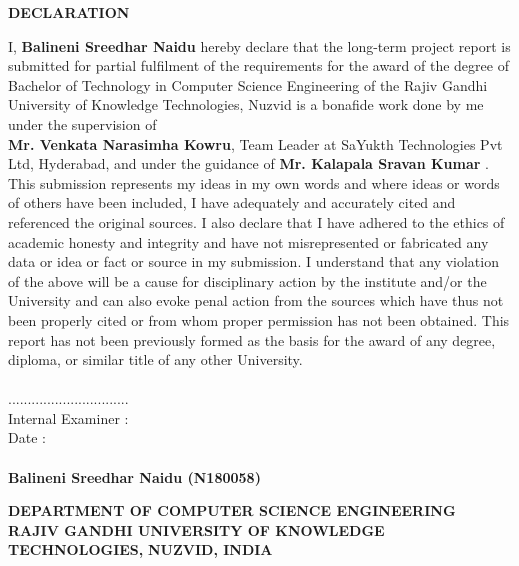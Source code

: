 \documentclass[12pt,a4paper,oneside]{report}
\begin{document}
\newpage
\thispagestyle{empty}
\vspace*{1cm}
\begin{center}{\large \bf DECLARATION}\end{center}
\vspace{1cm}
\hspace{1cm}I, \textbf{Balineni Sreedhar Naidu}  hereby declare that the long-term project report is submitted for partial fulfilment of the requirements for the award of the degree of Bachelor of Technology in Computer Science Engineering of the Rajiv Gandhi University of Knowledge Technologies, Nuzvid is a bonafide work done by me under the supervision of\\ \textbf{Mr. Venkata Narasimha Kowru}, Team Leader at SaYukth Technologies Pvt Ltd, Hyderabad, and under the guidance of \textbf{Mr. Kalapala Sravan Kumar }. This submission represents my ideas in my own words and where ideas or words of others have been included, I have adequately and accurately cited and referenced the original sources. I also declare that I have adhered to the ethics of academic honesty and integrity and have not misrepresented or fabricated any data or idea or fact or source in my submission. I understand that any violation of the above will be a cause for disciplinary action by the institute and/or the University and can also evoke penal action from the sources which have thus not been properly cited or from whom proper permission has not been obtained. This report has not been previously formed as the basis for the award of any degree, diploma, or similar title of any other University.
\\
\vspace{1cm} \\
...............................\\
Internal Examiner :\\
Date : \\
\vspace{1cm} \\
\textbf{Balineni Sreedhar Naidu (N180058)}  



\newpage
{}
\thispagestyle{empty}

\begin{center}
{\large \bf DEPARTMENT OF COMPUTER SCIENCE ENGINEERING}\\
{\large \bf RAJIV GANDHI UNIVERSITY OF KNOWLEDGE TECHNOLOGIES,}
{\large \bf NUZVID, INDIA}\vspace{0.1cm}\end{center}
\end{document}
